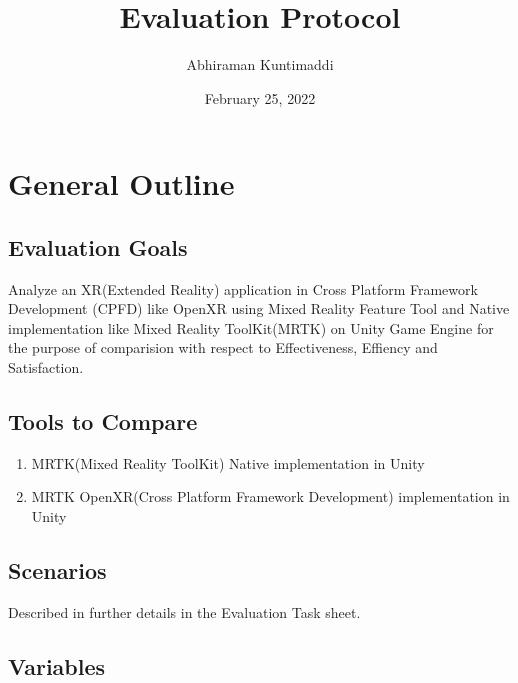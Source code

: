 \documentclass{article}
\title{\textbf{Evaluation Protocol}}
\author{Abhiraman Kuntimaddi}
\date{February 25, 2022}
\begin{document}
\maketitle

\section{General Outline}

\subsection{Evaluation Goals}

Analyze an XR(Extended Reality) application in Cross Platform Framework Development (CPFD) 
like OpenXR using Mixed Reality Feature Tool and Native implementation like Mixed Reality ToolKit(MRTK)
on Unity Game Engine for the purpose of comparision with respect to Effectiveness, Effiency and Satisfaction.

\subsection{Tools to Compare}

\begin{enumerate}[label=\textbf{\alph*}]
	\item MRTK(Mixed Reality ToolKit) Native implementation in Unity
	\item MRTK OpenXR(Cross Platform Framework Development) implementation in Unity
\end{enumerate}

\subsection{Scenarios}

Described in further details in the Evaluation Task sheet.

\subsection{Variables}
\end{document}
